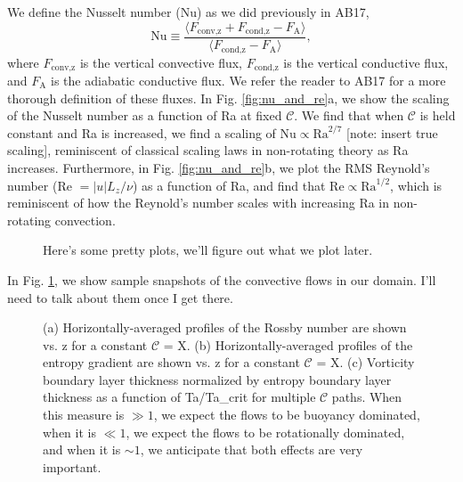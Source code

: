 \documentclass[twocolumn, amsmath, amsfonts, amssymb]{aastex62}
\begin{document}
We define the Nusselt number (Nu) as we did previously in AB17,
\begin{equation}
\text{Nu} \equiv \frac{\langle F_{\text{conv,z}} + F_{\text{cond,z}} - F_{\text{A}}\rangle}
{\langle F_{\text{cond,z}} - F_{\text{A}}\rangle},
\label{eqn:nusselt}
\end{equation}
where $F_{\text{conv,z}}$ is the vertical convective flux, $F_{\text{cond,z}}$ is the
vertical conductive flux, and $F_{\text{A}}$ is the adiabatic conductive flux. We refer
the reader to AB17 for a more thorough definition of these fluxes.
In Fig. \ref{fig:nu_and_re}a, we show the scaling of the Nusselt number as a function
of Ra at fixed $\mathcal{C}$. We find that when $\mathcal{C}$ is held constant and
Ra is increased, we find a scaling of $\text{Nu} \propto \text{Ra}^{2/7}$ [note:
insert true scaling], reminiscent of classical scaling laws in non-rotating theory as
Ra increases. Furthermore, in Fig. \ref{fig:nu_and_re}b, we plot the RMS Reynold's
number (Re $= |u| L_z / \nu$) as a function of Ra, and find that 
$\text{Re} \propto \text{Ra}^{1/2}$, which is reminiscent of how the Reynold's
number scales with increasing Ra in non-rotating convection.

\begin{figure}[h]
\caption{ Here's some pretty plots, we'll figure out what we plot later.
\label{fig:pretty_convection} }
\end{figure}

In Fig. \ref{fig:pretty_convection}, we show sample snapshots of the convective flows in
our domain. I'll need to talk about them once I get there.

\begin{figure}[h]
\caption{(a) Horizontally-averaged profiles of the Rossby number are shown
vs. z for a constant $\mathcal{C}$ = X. (b) Horizontally-averaged profiles of 
the entropy gradient are shown vs. z for a constant $\mathcal{C}$ = X.
(c) Vorticity boundary layer thickness normalized by entropy boundary layer
thickness as a function of Ta/Ta\_crit for multiple $\mathcal{C}$ paths.
When this measure is $\gg 1$, we expect the flows to be buoyancy dominated,
when it is $\ll 1$, we expect the flows to be rotationally dominated,
and when it is $\sim 1$, we anticipate that both effects are very important.
\label{fig:profiles_and_bls} }
\end{figure}
\end{document}
